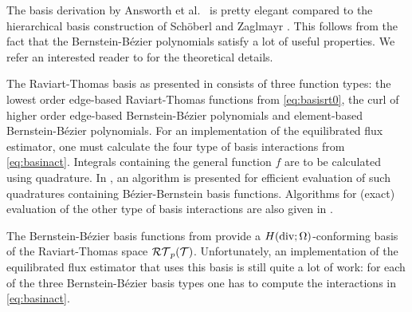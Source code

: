 \documentclass[thesis.tex]{subfiles}
\begin{document}
  The basis derivation  by Answorth et al.~\cite{ainsworthbernstein} is pretty elegant
  compared to the hierarchical basis construction of Sch\"oberl and Zaglmayr \cite{schoberl2005high}.
  This follows from the fact that the Bernstein-B\'ezier polynomials satisfy a lot of useful properties. We refer
  an interested reader to \cite{ainsworthbernstein, ainsworth} for the theoretical details.


  The Raviart-Thomas basis as presented in \cite{ainsworthbernstein} consists of three function types: the lowest order edge-based Raviart-Thomas functions from 
  \eqref{eq:basisrt0}, the curl of higher order edge-based Bernstein-B\'ezier polynomials and element-based Bernstein-B\'ezier polynomials.
  For an implementation of the equilibrated flux estimator, one must calculate the four type of basis interactions from \eqref{eq:basinact}.
  Integrals containing the general function $f$ are to be calculated using quadrature.
  In \cite{ainsworth}, an algorithm is presented for efficient evaluation of such quadratures containing B\'ezier-Bernstein basis functions.
  Algorithms for (exact) evaluation of the other type of basis interactions are also given in \cite{ainsworth}. 

  The Bernstein-B\'ezier basis functions from \cite{ainsworthbernstein} provide a $H(\operatorname{div};\Omega)$-conforming basis 
  of the Raviart-Thomas space $\mathcal{RT}_p(\mathcal{T})$.
  Unfortunately, an implementation of the equilibrated flux estimator that uses this basis is still quite a lot of work:
  for each of the three Bernstein-B\'ezier basis types one has to compute the interactions in \eqref{eq:basinact}. 
\end{document}
